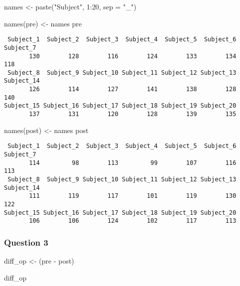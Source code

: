 \documentclass[
  letterpaper,
  DIV=11,
  numbers=noendperiod]{scrartcl}
\newenvironment{Shaded}{\begin{snugshade}}{\end{snugshade}}
\newcommand{\AttributeTok}[1]{\textcolor[rgb]{0.40,0.45,0.13}{#1}}
\newcommand{\DecValTok}[1]{\textcolor[rgb]{0.68,0.00,0.00}{#1}}
\newcommand{\FunctionTok}[1]{\textcolor[rgb]{0.28,0.35,0.67}{#1}}
\newcommand{\NormalTok}[1]{\textcolor[rgb]{0.00,0.23,0.31}{#1}}
\newcommand{\OtherTok}[1]{\textcolor[rgb]{0.00,0.23,0.31}{#1}}
\newcommand{\SpecialCharTok}[1]{\textcolor[rgb]{0.37,0.37,0.37}{#1}}
\newcommand{\StringTok}[1]{\textcolor[rgb]{0.13,0.47,0.30}{#1}}
\begin{document}
\begin{Shaded}
\begin{Highlighting}[]
\NormalTok{names }\OtherTok{\textless{}{-}} \FunctionTok{paste}\NormalTok{(}\StringTok{"Subject"}\NormalTok{, }\DecValTok{1}\SpecialCharTok{:}\DecValTok{20}\NormalTok{, }\AttributeTok{sep =} \StringTok{"\_"}\NormalTok{)}

\FunctionTok{names}\NormalTok{(pre) }\OtherTok{\textless{}{-}}\NormalTok{ names}
\NormalTok{pre}
\end{Highlighting}
\end{Shaded}

\begin{verbatim}
 Subject_1  Subject_2  Subject_3  Subject_4  Subject_5  Subject_6  Subject_7 
       130        128        116        124        133        134        118 
 Subject_8  Subject_9 Subject_10 Subject_11 Subject_12 Subject_13 Subject_14 
       126        114        127        141        138        128        140 
Subject_15 Subject_16 Subject_17 Subject_18 Subject_19 Subject_20 
       137        131        120        128        139        135 
\end{verbatim}

\begin{Shaded}
\begin{Highlighting}[]
\FunctionTok{names}\NormalTok{(post) }\OtherTok{\textless{}{-}}\NormalTok{ names}
\NormalTok{post}
\end{Highlighting}
\end{Shaded}

\begin{verbatim}
 Subject_1  Subject_2  Subject_3  Subject_4  Subject_5  Subject_6  Subject_7 
       114         98        113         99        107        116        113 
 Subject_8  Subject_9 Subject_10 Subject_11 Subject_12 Subject_13 Subject_14 
       111        119        117        101        119        130        122 
Subject_15 Subject_16 Subject_17 Subject_18 Subject_19 Subject_20 
       106        106        124        102        117        113 
\end{verbatim}

\subsubsection{Question 3}\label{question-3}

\begin{Shaded}
\begin{Highlighting}[]
\NormalTok{diff\_op }\OtherTok{\textless{}{-}}\NormalTok{ (pre }\SpecialCharTok{{-}}\NormalTok{ post)}

\NormalTok{diff\_op}
\end{Highlighting}
\end{Shaded}
\end{document}

